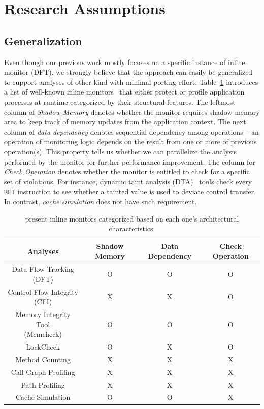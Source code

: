 \section{Research Assumptions} \label{sec:hypo} 

\subsection{\sreplica Generalization}
\label{ssec:general}

Even though our previous work mostly focuses on a specific instance of inline
monitor (\ie DFT), we strongly believe that the approach can easily be
generalized to support analyses of other kind with minimal porting effort.
Table~\ref{tab:analyses} introduces a list of well-known inline
monitors~\cite{cab:oopsala2009} that either protect or profile application
processes at runtime categorized by their structural features. The leftmost
column of {\it Shadow Memory} denotes whether the monitor requires shadow
memory area to keep track of memory updates from the application context. The
next column of {\it data dependency} denotes sequential dependency among
operations -- an operation of monitoring logic depends on the result from one
or more of previous operation(s). This property tells us whether we can
parallelize the analysis performed by the monitor for further performance
improvement. The column for {\it Check Operation} denotes whether the monitor
is entitled to check for a specific set of violations. For instance, dynamic
taint analysis (DTA)~\cite{taintcheck:ndss2005} tools check every {\tt RET}
instruction to see whether a tainted value is used to deviate control transfer.
In contrast, {\it cache simulation} does not have such requirement.

\begin{table}[h]
    \centering
\begin{tabular}{|c|c|c|c|}
\hline
Analyses & Shadow Memory & Data Dependency & Check Operation \\ 
\hline \hline
Data Flow Tracking (DFT) & O & O & O \\ \hline
Control Flow Integrity (CFI) & X & X & O \\ \hline
\specialcell{Memory Integrity Tool \\ (Memcheck)} & O & O & O \\ \hline
LockCheck & O & X & O \\ \hline
Method Counting & X & X & X \\ \hline
Call Graph Profiling & X & X & X \\ \hline
Path Profiling & X & X & X \\ \hline
Cache Simulation & O & O & X \\ \hline
\end{tabular}
\caption{ present inline monitors categorized based on each one's
architectural characteristics. \label{tab:analyses}}
\end{table}

